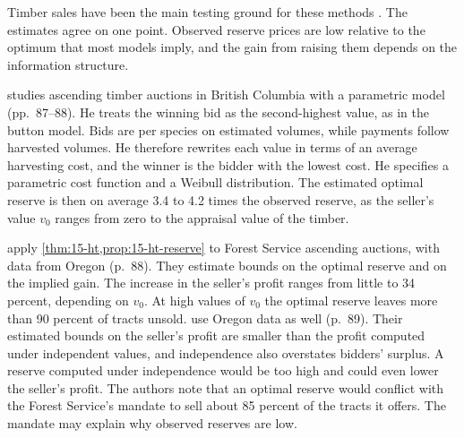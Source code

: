 Timber sales have been the main testing ground for these methods \citep[Section~2.1]{HortacsuPerrigne2021}.
The estimates agree on one point. Observed reserve prices are low relative to the optimum that most
models imply, and the gain from raising them depends on the information structure.

\citet{Paarsch1997} studies ascending timber auctions in British Columbia with a parametric model (pp.~87--88).
He treats the winning bid as the second-highest value, as in the button model. Bids are per species on
estimated volumes, while payments follow harvested volumes. He therefore rewrites each value in terms of an
average harvesting cost, and the winner is the bidder with the lowest cost. He specifies a parametric cost
function and a Weibull distribution. The estimated optimal reserve is then on average 3.4 to 4.2 times the
observed reserve, as the seller's value $v_0$ ranges from zero to the appraisal value of the timber.

\citet{HaileTamer2003} apply \cref{thm:15-ht,prop:15-ht-reserve} to Forest Service ascending auctions, with
data from Oregon (p.~88). They estimate bounds on the optimal reserve and on the implied gain. The increase in
the seller's profit ranges from little to 34 percent, depending on $v_0$. At high values of $v_0$ the optimal
reserve leaves more than 90 percent of tracts unsold. \citet{AradillasLopezGandhiQuint2013} use Oregon data
as well (p.~89). Their estimated bounds on the seller's profit are smaller than the profit computed under
independent values, and independence also overstates bidders' surplus. A reserve computed under independence
would be too high and could even lower the seller's profit. The authors note that an optimal reserve would
conflict with the Forest Service's mandate to sell about 85 percent of the tracts it offers. The mandate may
explain why observed reserves are low.

